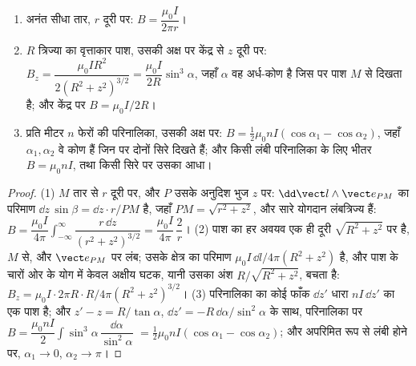 \begin{proposition}[तार, पाश, परिनालिका]\label{prop:b1:magnetostatics:three}
\begin{enumerate}
  \item अनंत सीधा तार, $r$ दूरी पर: $B = \dfrac{\mu_0I}{2\pi r}$।
  \item $R$ त्रिज्या का वृत्ताकार पाश, उसकी अक्ष पर केंद्र से $z$ दूरी पर:
        $B_z = \dfrac{\mu_0IR^2}{2(R^2 + z^2)^{3/2}} = \dfrac{\mu_0I}{2R}
        \sin^3\alpha$, जहाँ $\alpha$ वह अर्ध-कोण है जिस पर पाश
        $M$ से दिखता है; और केंद्र पर $B = \mu_0I/2R$।
  \item प्रति मीटर $n$ फेरों की परिनालिका, उसकी अक्ष पर: $B = \tfrac12\mu_0nI
        (\cos\alpha_1 - \cos\alpha_2)$, जहाँ $\alpha_1, \alpha_2$ वे कोण हैं जिन
        पर दोनों सिरे दिखते हैं; और किसी लंबी परिनालिका के लिए भीतर
        $B = \mu_0nI$, तथा किसी सिरे पर उसका आधा।
\end{enumerate}
\end{proposition}

\begin{proof}
(1) $M$ तार से $r$ दूरी पर, और $P$ उसके अनुदिश भुज $z$ पर:
$\dd\vect l\wedge\vect e_{PM}$ का परिमाण $\dd z\,\sin\beta = \dd z\cdot r/PM$
है, जहाँ $PM = \sqrt{r^2 + z^2}$, और सारे योगदान लंबत्रिज्य हैं:
$B = \dfrac{\mu_0I}{4\pi}\displaystyle\int_{-\infty}^{\infty}\dfrac{r\,\dd z}{(r^2 + z^2)^{3/2}}
= \dfrac{\mu_0I}{4\pi}\,\dfrac{2}{r}$। (2) पाश का हर अवयव एक ही दूरी
$\sqrt{R^2 + z^2}$ पर है, $M$ से, और
$\vect e_{PM}$ पर लंब; उसके क्षेत्र का परिमाण $\mu_0I\,\dd l/4\pi(R^2 + z^2)$ है, और
पाश के चारों ओर के योग में केवल अक्षीय घटक, यानी उसका अंश $R/\sqrt{R^2 + z^2}$,
बचता है: $B_z = \mu_0I\cdot2\pi R\cdot R/4\pi(R^2 +
z^2)^{3/2}$। (3) परिनालिका का कोई फाँक $\dd z'$ धारा
$nI\,\dd z'$ का एक पाश है; और $z' - z = R/\tan\alpha$, $\dd z' = -R\,\dd\alpha/\sin^2\alpha$
के साथ, परिनालिका पर $B = \dfrac{\mu_0nI}{2}\displaystyle\int\sin^3\alpha\,\dfrac{\dd\alpha}{\sin^2\alpha}$
$= \tfrac12\mu_0nI(\cos\alpha_1 - \cos\alpha_2)$; और अपरिमित रूप से लंबी होने पर,
$\alpha_1 \to 0$, $\alpha_2 \to \pi$।
\end{proof}

